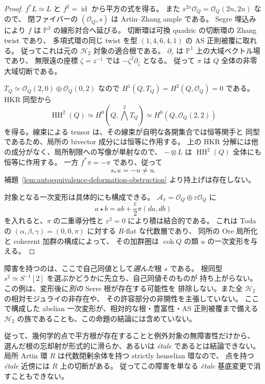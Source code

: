 \begin{proof}
$f^*L\simeq L$ と $f^2=\operatorname{id}$ から平方の式を得る。
また $s^{2n}\mathcal O_Q=\mathcal O_Q(2n,2n)$ なので、
閉ファイバーの $(\mathcal O_Q,s)$ は Artin--Zhang ample である。
Segre 埋込みにより $f$ は $\mathbb P^3$ の線形対合へ延びる。
切断環は可換 quadric の切断環の Zhang twist であり、
多項式環の同じ twist を型 $(1,4,6,4,1)$ の AS 正則被覆に取れる。
従ってこれは元の $\mathcal H_2$ 対象の適合根である。
$\partial_z$ は $\mathbb P^1$ 上の大域ベクトル場であり、
無限遠の座標 $\zeta=z^{-1}$ では $-\zeta^2\partial_\zeta$ となる。
従って $\pi$ は $Q$ 全体の非零大域切断である。

$T_Q\simeq\mathcal O_Q(2,0)\oplus\mathcal O_Q(0,2)$ なので
$H^1(Q,T_Q)=H^2(Q,\mathcal O_Q)=0$ である。HKR 同型から
\[
 \operatorname{HH}^2(Q)
 \simeq H^0(Q,\textstyle\bigwedge^2 T_Q)
 \simeq H^0(Q,\mathcal O_Q(2,2))
\]
を得る。線束による tensor は、その線束が自明な各開集合では恒等関手と
同型であるため、局所の bivector 成分には恒等に作用する。
上の HKR 分解には他の成分がなく、局所制限への写像が単射なので、
$-\otimes L$ は $\operatorname{HH}^2(Q)$ 全体にも恒等に作用する。
一方 $f^*\pi=-\pi$ であり、従って
\[
 s_*u=-u\ne u.
\]
補題~\ref{lem:autoequivalence-deformation-obstruction} より持上げは存在しない。

対象となる一次変形は具体的にも構成できる。
$\mathcal A_\pi=\mathcal O_Q\oplus\varepsilon\mathcal O_Q$ に
\[
 a\star b=ab+\frac{\varepsilon}{2}\pi(da,db)
\]
を入れると、$\pi$ の二重導分性と $\varepsilon^2=0$ により積は結合的である。
これは Toda~\cite[\S\S3--4, arXiv v3]{Toda2009} の
$(\alpha,\beta,\gamma)=(0,0,\pi)$ に対する $R$-flat な代数層であり、
同所の Ore 局所化と coherent 加群の構成によって、
その加群圏は $\operatorname{coh}Q$ の類 $u$ の一次変形を与える。
\end{proof}

\begin{remark}[結論の範囲]
障害を持つのは、ここで自己同値として\emph{選んだ}根 $s$ である。
根同型 $s^2\simeq S^{-1}[2]$ を選ぶかどうかに先立ち、自己同値そのものが
持ち上がらない。この例は、変形後に\emph{別の} Serre 根が存在する可能性を
排除しない。また全 $\mathcal H_2$ の相対モジュライの非存在や、
その許容部分の非開性を主張していない。
ここで構成した abelian 一次変形が、相対的な根・豊富性・AS 正則被覆まで備える
$\mathcal H_2$ の族であることも、この命題の結論には含めていない。

従って、幾何学的点で平方根が存在することと例外対象の無障害性だけから、
選んだ根の忘却射が形式的に滑らか、あるいは \emph{\'etale} であるとは結論できない。
局所 Artin 環 $R$ は代数閉剰余体を持つ strictly henselian 環なので、
点を持つ \emph{\'etale} 近傍には $R$ 上の切断がある。
従ってこの障害を単なる \emph{\'etale} 基底変更で消すこともできない。
\end{remark}
